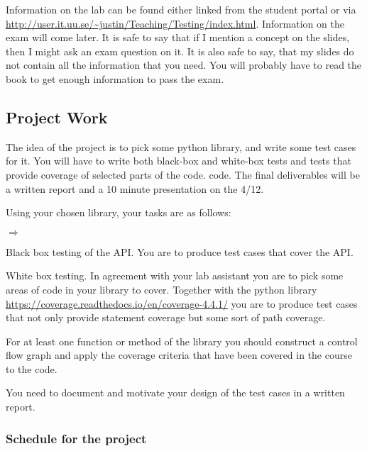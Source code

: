 \documentclass[a4page]{article}
\begin{document}
  Information on the lab can be found either linked from the student portal or
  via
  \url{http://user.it.uu.se/~justin/Teaching/Testing/index.html}. Information
  on the exam will come later. It is safe to say that if I mention a concept
  on the slides, then I might ask an exam question on it. It is also safe to
  say, that my slides do not contain all the information that you need. You
  will probably have to read the book to get enough information to pass the
  exam.

\subsection{Project Work}

The idea of the project is to pick some python library, and write some
test cases for it. You will have to write both black-box and white-box
tests and tests that provide coverage of selected parts of the
code. code. The final deliverables will be a written report and a 10 minute
presentation on the 4/12.

Using your chosen library, your tasks are as follows:
\begin{list}{$\Rightarrow$}{} 
    \item  Black box testing of the API. You are to produce test cases
      that cover the API.
    \item  White box testing. In agreement with your lab assistant you
      are to pick some areas of code in your library to cover. Together with
      the python library
      \url{https://coverage.readthedocs.io/en/coverage-4.4.1/} you are
      to produce test cases that not only provide statement coverage
      but some sort of path coverage. 
    \item For at least one function or method of the library you
      should construct a control flow graph and apply the coverage criteria
      that have been covered in the course to the code.
    \item You need to document and motivate your design of the test cases in
      a written report. 
\end{list}

\subsubsection*{Schedule for the project}
\end{document}
